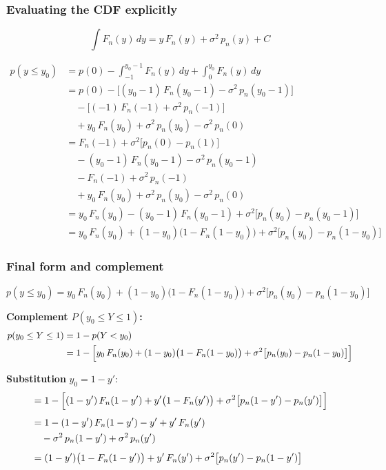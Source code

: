 \subsubsection*{Evaluating the CDF explicitly}

\[
\int F_n(y)\,dy = y\,F_n(y) + \sigma^2\,p_n(y) + C
\]

\begin{align*}
p(y \leq y_0)
  &= p(0)
   - \int_{-1}^{y_0-1} F_n(y)\,dy
   + \int_0^{y_0} F_n(y)\,dy \\[6pt]
  &= p(0)
   - \bigl[(y_0-1)\,F_n(y_0-1) - \sigma^2\,p_n(y_0-1)\bigr] \\
  &\quad - \bigl[(-1)\,F_n(-1) + \sigma^2\,p_n(-1)\bigr] \\
  &\quad + y_0\,F_n(y_0) + \sigma^2\,p_n(y_0) - \sigma^2\,p_n(0) \\[6pt]
  &= F_n(-1) + \sigma^2\bigl[p_n(0) - p_n(1)\bigr] \\
  &\quad - (y_0-1)\,F_n(y_0-1) - \sigma^2\,p_n(y_0-1) \\
  &\quad - F_n(-1) + \sigma^2\,p_n(-1) \\
  &\quad + y_0\,F_n(y_0) + \sigma^2\,p_n(y_0) - \sigma^2\,p_n(0) \\[6pt]
  &= y_0\,F_n(y_0) - (y_0-1)\,F_n(y_0-1)
   + \sigma^2\bigl[p_n(y_0) - p_n(y_0-1)\bigr] \\[6pt]
  &= y_0\,F_n(y_0) + (1-y_0)\bigl(1 - F_n(1-y_0)\bigr)
   + \sigma^2\bigl[p_n(y_0) - p_n(1-y_0)\bigr]
\end{align*}

\subsubsection*{Final form and complement}

\[
p(y \leq y_0)
  = y_0\,F_n(y_0)
  + (1-y_0)\bigl(1 - F_n(1-y_0)\bigr)
  + \sigma^2\bigl[p_n(y_0) - p_n(1-y_0)\bigr]
\]

\textbf{Complement $P(y_0 \leq Y \leq 1)$:}
\begin{align*}
p(y_0 \leq Y \leq 1)
  &= 1 - p(Y < y_0) \\
  &= 1 - \Bigl[
      y_0\,F_n(y_0)
      + (1-y_0)\bigl(1-F_n(1-y_0)\bigr)
      + \sigma^2\bigl[p_n(y_0) - p_n(1-y_0)\bigr]
    \Bigr]
\end{align*}

\textbf{Substitution} $y_0 = 1 - y'$:
\begin{align*}
  &= 1 - \Bigl[
      (1-y')\,F_n(1-y')
      + y'\bigl(1 - F_n(y')\bigr)
      + \sigma^2\bigl[p_n(1-y') - p_n(y')\bigr]
    \Bigr] \\[4pt]
  &= 1 - (1-y')\,F_n(1-y') - y' + y'\,F_n(y') \\
  &\quad - \sigma^2\,p_n(1-y') + \sigma^2\,p_n(y') \\[4pt]
  &= (1-y')\bigl(1 - F_n(1-y')\bigr)
   + y'\,F_n(y')
   + \sigma^2\bigl[p_n(y') - p_n(1-y')\bigr]
\end{align*}

